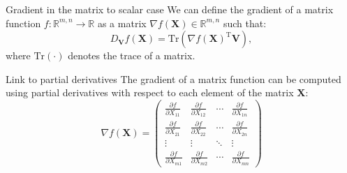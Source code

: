\documentclass[aspectratio=1610]{beamer}
\begin{document}
  
\begin{frame}{Gradient in the matrix to scalar case}
  We can define the gradient of a matrix function $f:\mathbb{R}^{m,n} \to \mathbb{R}$ as a matrix $\nabla f(\mathbf{X}) \in \mathbb{R}^{m,n}$ such that:
  $$
  D_{\mathbf{V}}f(\mathbf{X}) = \mathrm{Tr}(\nabla f(\mathbf{X})^\mathrm{T} \mathbf{V}),
  $$
  where $\mathrm{Tr}(\cdot)$ denotes the trace of a matrix.

  \begin{block}{Link to partial derivatives}
    The gradient of a matrix function can be computed using partial derivatives with respect to each element of the matrix $\mathbf{X}$:
    $$
    \nabla f(\mathbf{X}) = \begin{pmatrix}
      \frac{\partial f}{\partial X_{11}} & \frac{\partial f}{\partial X_{12}} & \cdots & \frac{\partial f}{\partial X_{1n}} \\
      \frac{\partial f}{\partial X_{21}} & \frac{\partial f}{\partial X_{22}} & \cdots & \frac{\partial f}{\partial X_{2n}} \\
      \vdots & \vdots & \ddots & \vdots \\
      \frac{\partial f}{\partial X_{m1}} & \frac{\partial f}{\partial X_{m2}} & \cdots & \frac{\partial f}{\partial X_{mn}}
      \end{pmatrix}
      $$
  \end{block}
\end{frame}
\end{document}
